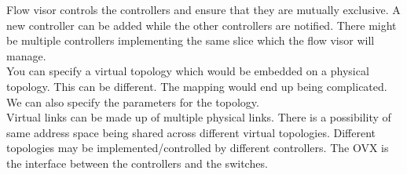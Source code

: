\documentclass[solution,addpoints,12pt]{exam}
\begin{document}
Flow visor controls the controllers and ensure that they are mutually
exclusive. A new controller can be added while the other
controllers are notified. There might be multiple controllers
implementing the same slice which the flow visor will manage.\\
You can specify a virtual topology which would be embedded on a physical
topology. This can be different. The mapping would end up being
complicated. We can also specify the parameters for the topology.\\

Virtual links can be made up of multiple physical links.
There is a possibility of same address space being shared across
different virtual topologies. Different topologies may be
implemented/controlled by different controllers. The OVX
is the interface between the controllers and the switches.
\end{document}

